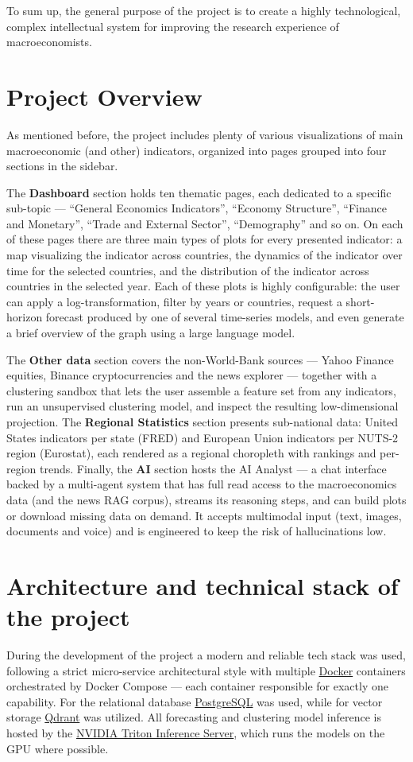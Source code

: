 \documentclass[a4paper,12pt]{article}
\begin{document}
To sum up, the general purpose of the project is to create a highly technological, complex intellectual system for improving the research experience of macroeconomists.

\section{Project Overview}
As mentioned before, the project includes plenty of various visualizations of main macroeconomic (and other) indicators, organized into pages grouped into four sections in the sidebar.

The \textbf{Dashboard} section holds ten thematic pages, each dedicated to a specific sub-topic --- ``General Economics Indicators'', ``Economy Structure'', ``Finance and Monetary'', ``Trade and External Sector'', ``Demography'' and so on.
On each of these pages there are three main types of plots for every presented indicator: a map visualizing the indicator across countries, the dynamics of the indicator over time for the selected countries, and the distribution of the indicator across countries in the selected year.
Each of these plots is highly configurable: the user can apply a log-transformation, filter by years or countries, request a short-horizon forecast produced by one of several time-series models, and even generate a brief overview of the graph using a large language model.

The \textbf{Other data} section covers the non-World-Bank sources --- Yahoo Finance equities, Binance cryptocurrencies and the news explorer --- together with a clustering sandbox that lets the user assemble a feature set from any indicators, run an unsupervised clustering model, and inspect the resulting low-dimensional projection.
The \textbf{Regional Statistics} section presents sub-national data: United States indicators per state (FRED) and European Union indicators per NUTS-2 region (Eurostat), each rendered as a regional choropleth with rankings and per-region trends.
Finally, the \textbf{AI} section hosts the AI Analyst --- a chat interface backed by a multi-agent system that has full read access to the macroeconomics data (and the news RAG corpus), streams its reasoning steps, and can build plots or download missing data on demand. It accepts multimodal input (text, images, documents and voice) and is engineered to keep the risk of hallucinations low.

\section{Architecture and technical stack of the project}
During the development of the project a modern and reliable tech stack was used, following a strict micro-service architectural style with multiple \href{https://www.docker.com/}{Docker} containers orchestrated by Docker Compose --- each container responsible for exactly one capability.
For the relational database \href{https://www.postgresql.org/}{PostgreSQL} was used, while for vector storage \href{https://qdrant.tech/}{Qdrant} was utilized.
All forecasting and clustering model inference is hosted by the \href{https://developer.nvidia.com/triton-inference-server}{NVIDIA Triton Inference Server}, which runs the models on the GPU where possible.
\end{document}
